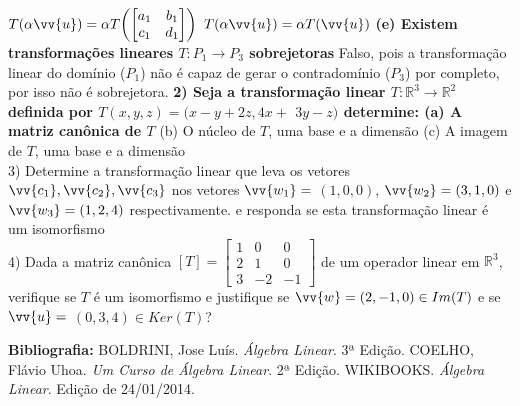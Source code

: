 \documentclass[11pt,a4paper]{article}
\newcommand\tab[1][1.835cm]{\hspace*{#1}}
\newcommand\taba[1][2.55cm]{\hspace*{#1}}
\begin{document}
\begin{flushleft}
\taba \hspace{0.4cm} $T( \alpha \vv{u} ) = \alpha T {\begin{pmatrix} {\begin{bmatrix} a_1 & b_1 \\c_1 & d_1 \end{bmatrix} } \end{pmatrix}} $ \linebreak
\taba \hspace{0.4cm} $T(\alpha \vv{u}) = \alpha T(\vv{u})$ \linebreak
\newline
\taba \textbf{(e) Existem transformações lineares $T:P_1 \rightarrow P_3$ sobrejetoras}\linebreak
\taba Falso, pois a transformação linear do domínio ($P_1$) não é capaz de gerar o contradomínio ($P_3$) por completo, por isso não é sobrejetora. 
\newline \newline
\tab \textbf{2) Seja a transformação linear $T:\mathbb{R}^3 \rightarrow \mathbb{R}^2$ definida por $T(x,y,z) = (x-y+2z,4x+ $ $3y-z)$ determine: \linebreak
\taba(a) A matriz canônica de $T$}\linebreak
\taba(b) O núcleo de $T$, uma base e a dimensão \linebreak
\taba(c) A imagem de $T$, uma base e a dimensão \linebreak
\\
\tab 3) Determine a transformação linear que leva os vetores $\vv{c_1}, \vv{c_2}, \vv{c_3}$ nos vetores $\vv{w_1}=$ $(1,0,0)$, $\vv{w_2}=(3,1,0)$ e $\vv{w_3}=(1,2,4)$ respectivamente. e responda se esta transformação linear é um isomorfismo\linebreak
\\
\tab 4) Dada a matriz canônica $[T]= \begin{bmatrix}
1 & 0 & 0\\ 2 & 1 & 0\\ 3 & -2 & -1 \end{bmatrix}$ de um operador linear em $\mathbb{R}^3$, verifique se $T$ é um isomorfismo e justifique se $\vv{w}=(2,-1,0) \in Im(T)$ e se $\vv{u}= $ $(0,3,4) \in Ker(T)$?\linebreak



%
%
\textbf{Bibliografia: }BOLDRINI, Jose Luís. \textit{Álgebra Linear}. 3ª Edição. \linebreak
\taba COELHO, Flávio Uhoa. \textit{Um Curso de Álgebra Linear}. 2ª Edição.
\taba WIKIBOOKS. \textit{Álgebra Linear}. Edição de 24/01/2014. \linebreak
\end{flushleft}
\end{document}
